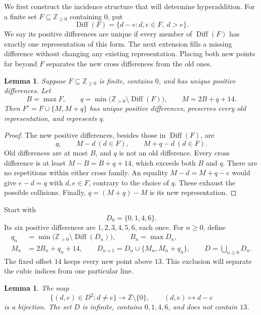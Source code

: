 \documentclass[11pt]{article}
\newtheorem{lemma}[theorem]{Lemma}
\theoremstyle{remark}
\newcommand{\Z}{\mathbb Z}
\DeclareMathOperator{\Diff}{Diff}
\begin{document}
We first construct the incidence structure that will determine
hyperaddition. For a finite set $F\subseteq\Z_{\ge0}$ containing $0$, put
\[
 \Diff(F)=\{d-e:d,e\in F,\ d>e\}.
\]
We say its positive differences are unique if every member of
$\Diff(F)$ has exactly one representation of this form.
The next extension fills a missing difference without changing any
existing representation. Placing both new points far beyond $F$
separates the new cross differences from the old ones.
\begin{lemma}\label{lem:extension}
Suppose $F\subseteq\Z_{\ge0}$ is finite, contains $0$, and has unique
positive differences. Let
\[
 B=\max F,\qquad
 q=\min\bigl(\Z_{>0}\setminus\Diff(F)\bigr),\qquad
 M=2B+q+14.
\]
Then $F'=F\cup\{M,M+q\}$ has unique positive differences, preserves
every old representation, and represents $q$.
\end{lemma}

\begin{proof}
The new positive differences, besides those in $\Diff(F)$, are
\[
 q,\qquad M-d\ (d\in F),\qquad M+q-d\ (d\in F).
\]
Old differences are at most $B$, and $q$ is not an old difference.
Every cross difference is at least
$M-B=B+q+14$, which exceeds both $B$ and $q$.
There are no repetitions within either cross family. An equality
$M-d=M+q-e$ would give $e-d=q$ with $d,e\in F$, contrary to the
choice of $q$. These exhaust the possible collisions. Finally,
$q=(M+q)-M$ is its new representation.
\end{proof}

Start with
\begin{equation}\label{eq:seed}
 D_0=\{0,1,4,6\}.
\end{equation}
Its six positive differences are $1,2,3,4,5,6$, each once.
For $n\ge0$, define
\begin{equation}\label{eq:recursion}
 \begin{split}
 q_n&=\min\bigl(\Z_{>0}\setminus\Diff(D_n)\bigr),\qquad
 B_n=\max D_n,\\
 M_n&=2B_n+q_n+14,\qquad
 D_{n+1}=D_n\cup\{M_n,M_n+q_n\},\qquad
 D=\bigcup_{n\ge0}D_n.
 \end{split}
\end{equation}
The fixed offset $14$ keeps every new point above $13$.
This exclusion will separate the cubic indices from one particular line.

\begin{lemma}\label{lem:perfect}
The map
\[
 \{(d,e)\in D^2:d\ne e\}\longrightarrow\Z\setminus\{0\},
 \qquad (d,e)\longmapsto d-e
\]
is a bijection. The set $D$ is infinite, contains $0,1,4,6$, and does
not contain $13$.
\end{lemma}
\end{document}
